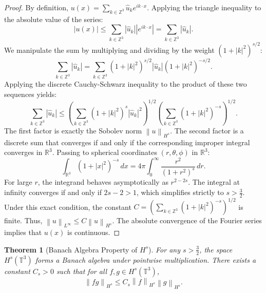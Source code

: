 \documentclass[12pt,a4paper]{article}
\theoremstyle{plain}
\newtheorem{theorem}{Theorem}[section]
\theoremstyle{definition}
\theoremstyle{remark}
\newcommand{\T}{\mathbb{T}}
\newcommand{\Z}{\mathbb{Z}}
\newcommand{\R}{\mathbb{R}}
\newcommand{\norm}[1]{\left\|#1\right\|}
\newcommand{\abs}[1]{\left|#1\right|}
\begin{document}
\begin{proof}
By definition, $u(x) = \sum_{k \in \Z^3} \hat{u}_k e^{ik \cdot x}$. Applying the triangle inequality to the absolute value of the series:
\[
  \abs{u(x)} \le \sum_{k \in \Z^3} \abs{\hat{u}_k} \abs{e^{ik \cdot x}} = \sum_{k \in \Z^3} \abs{\hat{u}_k}.
\]
We manipulate the sum by multiplying and dividing by the weight $(1+|k|^2)^{s/2}$:
\[
  \sum_{k \in \Z^3} \abs{\hat{u}_k} = \sum_{k \in \Z^3} (1+|k|^2)^{s/2} \abs{\hat{u}_k} (1+|k|^2)^{-s/2}.
\]
Applying the discrete Cauchy-Schwarz inequality to the product of these two sequences yields:
\[
  \sum_{k \in \Z^3} \abs{\hat{u}_k} \le \left( \sum_{k \in \Z^3} (1+|k|^2)^s \abs{\hat{u}_k}^2 \right)^{1/2} \left( \sum_{k \in \Z^3} (1+|k|^2)^{-s} \right)^{1/2}.
\]
The first factor is exactly the Sobolev norm $\norm{u}_{H^s}$. The second factor is a discrete sum that converges if and only if the corresponding improper integral converges in $\R^3$. Passing to spherical coordinates $(r, \theta, \phi)$ in $\R^3$:
\[
  \int_{\R^3} (1+|x|^2)^{-s} \,dx = 4\pi \int_0^\infty \frac{r^2}{(1+r^2)^s} \,dr.
\]
For large $r$, the integrand behaves asymptotically as $r^{2-2s}$. The integral at infinity converges if and only if $2s - 2 > 1$, which simplifies strictly to $s > \frac{3}{2}$. Under this exact condition, the constant $C = \left( \sum_{k \in \Z^3} (1+|k|^2)^{-s} \right)^{1/2}$ is finite. Thus, $\norm{u}_{L^\infty} \le C \norm{u}_{H^s}$. The absolute convergence of the Fourier series implies that $u(x)$ is continuous.
\end{proof}

\begin{theorem}[Banach Algebra Property of $H^s$]
\label{thm:banach_algebra}
For any $s > \frac{3}{2}$, the space $H^s(\T^3)$ forms a Banach algebra under pointwise multiplication. There exists a constant $C_s > 0$ such that for all $f, g \in H^s(\T^3)$,
\[
  \norm{fg}_{H^s} \le C_s \norm{f}_{H^s} \norm{g}_{H^s}.
\]
\end{theorem}
\end{document}
